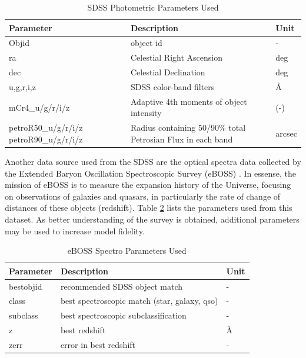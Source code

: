 \documentclass[11pt,sigconf]{acmart}
\begin{document}
\begin{table}[]
  \begin{tabular}{ |p{3.0cm}|p{3.2cm}|p{1.0cm}|  } \hline
   \textbf{Parameter} & \textbf{Description} & \textbf{Unit}  \\ \hline
   Objid & object id  & - \\ \hline
   ra & Celestial Right Ascension & deg \\ \hline
   dec & Celestial Declination & deg \\ \hline
   u,g,r,i,z & SDSS color-band filters & \AA \\ \hline
   mCr4\_u/g/r/i/z & Adaptive 4th moments of object intensity & (-) \\ \hline
   petroR50\_u/g/r/i/z petroR90\_u/g/r/i/z & Radius containing 50/90\% total Petrosian Flux in each band & arcsec \\ \hline
  \end{tabular}
  \caption{\label{tab:table_IMAGE}SDSS Photometric Parameters Used}
  \end{table}

Another data source used from the SDSS are the optical spectra data collected by the 
Extended Baryon Oscillation Spectroscopic Survey (eBOSS) \cite{galaxy_eboss}. In essense,
the mission of eBOSS is to measure the expansion history of the Universe, focusing on 
observations of galaxies and quasars, in particularly the rate of change of 
distances of these objects (redshift). Table \ref{tab:table_eboss} lists the parameters 
used from this dataset. As better understanding of the survey is obtained, additional 
parameters may be used to increase model fidelity.  

\begin{table}[]
  \begin{tabular}{ |p{1.8cm}|p{4.0cm}|p{1.0cm}|  } \hline
   \textbf{Parameter} & \textbf{Description} & \textbf{Unit}  \\ \hline
   bestobjid & recommended SDSS object match  & - \\ \hline
   class & best spectroscopic match (star, galaxy, qso) & - \\ \hline
   subclass & best spectroscopic subclassification & - \\ \hline
   z & best redshift & \AA \\ \hline
   zerr & error in best redshift & - \\ \hline
  \end{tabular}
  \caption{\label{tab:table_eboss}eBOSS Spectro Parameters Used}
  \end{table}
\end{document}
